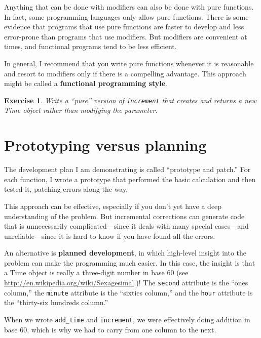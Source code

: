 \documentclass[12pt,a4paper,final,twoside,onecolumn,titlepage]{book}
\newtheorem{exercise}{Exercise}[chapter]
\begin{document}
Anything that can be done with modifiers can also be done with pure
functions.  In fact, some programming languages only allow pure
functions.  There is some evidence that programs that use pure
functions are faster to develop and less error-prone than programs
that use modifiers.  But modifiers are convenient at times,
and functional programs tend to be less efficient.

In general, I recommend that you write pure functions whenever it is
reasonable and resort to modifiers only if there is a compelling
advantage.  This approach might be called a {\bf functional
programming style}.


\begin{exercise}

Write a ``pure'' version of {\tt increment} that creates and returns
a new Time object rather than modifying the parameter.

\end{exercise}


\section{Prototyping versus planning}
\label{prototype}

The development plan I am demonstrating is called ``prototype and
patch.''  For each function, I wrote a prototype that performed the
basic calculation and then tested it, patching errors along the
way.

This approach can be effective, especially if you don't yet have a
deep understanding of the problem.  But incremental corrections can
generate code that is unnecessarily complicated---since it deals with
many special cases---and unreliable---since it is hard to know if you
have found all the errors.

An alternative is {\bf planned development}, in which high-level
insight into the problem can make the programming much easier.  In
this case, the insight is that a Time object is really a three-digit
number in base 60 (see \url{http://en.wikipedia.org/wiki/Sexagesimal}.)!  The
{\tt second} attribute is the ``ones column,'' the {\tt minute}
attribute is the ``sixties column,'' and the {\tt hour} attribute is
the ``thirty-six hundreds column.''

When we wrote \verb"add_time" and {\tt increment}, we were effectively
doing addition in base 60, which is why we had to carry from one
column to the next.
\end{document}
